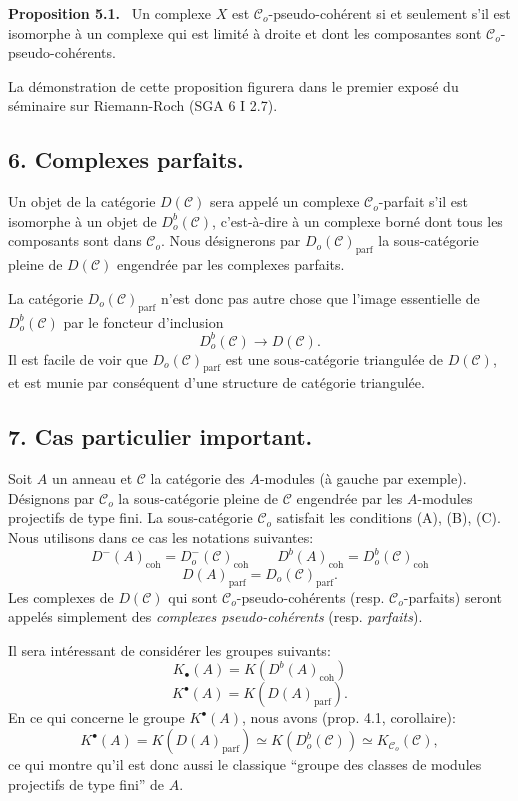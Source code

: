 \documentclass[11pt]{article}
\newenvironment{statement}[1]{\par\medskip\noindent\textbf{#1.}\ }{\par\medskip}
\providecommand{\parf}{\mathrm{parf}}
\providecommand{\coh}{\mathrm{coh}}
\providecommand{\cC}{\mathcal C}
\providecommand{\cC}{\mathcal C}
\providecommand{\parf}{\mathrm{parf}}
\providecommand{\coh}{\mathrm{coh}}
\begin{document}
\begin{statement}{Proposition 5.1}
Un complexe $X$ est $\cC_o$-pseudo-cohérent si et seulement s'il est isomorphe à un complexe qui est limité à droite et dont les composantes sont $\cC_o$-pseudo-cohérents.
\end{statement}

La démonstration de cette proposition figurera dans le premier exposé du séminaire sur Riemann-Roch (SGA 6 I 2.7).

\subsection*{6. Complexes parfaits.}

Un objet de la catégorie $D(\cC)$ sera appelé un complexe $\cC_o$-parfait s'il est isomorphe à un objet de $D_o^b(\cC)$, c'est-à-dire à un complexe borné dont tous les composants sont dans $\cC_o$. Nous désignerons par $D_o(\cC)_{\parf}$ la sous-catégorie pleine de $D(\cC)$ engendrée par les complexes parfaits.

La catégorie $D_o(\cC)_{\parf}$ n'est donc pas autre chose que l'image essentielle de $D_o^b(\cC)$ par le foncteur d'inclusion
\[
D_o^b(\cC)\longrightarrow D(\cC).
\]
Il est facile de voir que $D_o(\cC)_{\parf}$ est une sous-catégorie triangulée de $D(\cC)$, et est munie par conséquent d'une structure de catégorie triangulée.

\subsection*{7. Cas particulier important.}

Soit $A$ un anneau et $\cC$ la catégorie des $A$-modules (à gauche par exemple). Désignons par $\cC_o$ la sous-catégorie pleine de $\cC$ engendrée par les $A$-modules projectifs de type fini. La sous-catégorie $\cC_o$ satisfait les conditions (A), (B), 
(C).
Nous utilisons dans ce cas les notations suivantes:
\[
D^-(A)_{\coh}=D_o^-(\cC)_{\coh}\qquad
D^b(A)_{\coh}=D_o^b(\cC)_{\coh}
\]
\[
D(A)_{\parf}=D_o(\cC)_{\parf}.
\]
Les complexes de $D(\cC)$ qui sont $\cC_o$-pseudo-cohérents (resp. $\cC_o$-parfaits) seront appelés simplement des \emph{complexes pseudo-cohérents} (resp. \emph{parfaits}).

Il sera intéressant de considérer les groupes suivants:
\[
K_\bullet(A)=K(D^b(A)_{\coh})
\]
\[
K^\bullet(A)=K(D(A)_{\parf}).
\]
En ce qui concerne le groupe $K^\bullet(A)$, nous avons (prop. 4.1, corollaire):
\[
K^\bullet(A)=K(D(A)_{\parf})\simeq K(D_o^b(\cC))\simeq K_{\cC_o}(\cC),
\]
ce qui montre qu'il est donc aussi le classique ``groupe des classes de modules projectifs de type fini'' de $A$.
\end{document}
